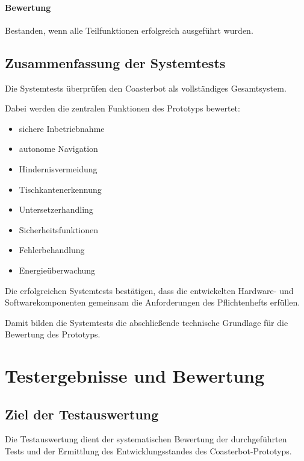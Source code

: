 \paragraph{Bewertung}\label{bewertung-33}

Bestanden, wenn alle Teilfunktionen erfolgreich ausgeführt wurden.

\subsection{Zusammenfassung der
Systemtests}\label{zusammenfassung-der-systemtests}

Die Systemtests überprüfen den Coasterbot als vollständiges
Gesamtsystem.

Dabei werden die zentralen Funktionen des Prototyps bewertet:

\begin{itemize}
\tightlist
\item
  sichere Inbetriebnahme
\item
  autonome Navigation
\item
  Hindernisvermeidung
\item
  Tischkantenerkennung
\item
  Untersetzerhandling
\item
  Sicherheitsfunktionen
\item
  Fehlerbehandlung
\item
  Energieüberwachung
\end{itemize}

Die erfolgreichen Systemtests bestätigen, dass die entwickelten
Hardware- und Softwarekomponenten gemeinsam die Anforderungen des
Pflichtenhefts erfüllen.

Damit bilden die Systemtests die abschließende technische Grundlage für
die Bewertung des Prototyps.

\section{Testergebnisse und
Bewertung}\label{testergebnisse-und-bewertung}

\subsection{Ziel der Testauswertung}\label{ziel-der-testauswertung}

Die Testauswertung dient der systematischen Bewertung der durchgeführten
Tests und der Ermittlung des Entwicklungsstandes des
Coasterbot-Prototyps.

